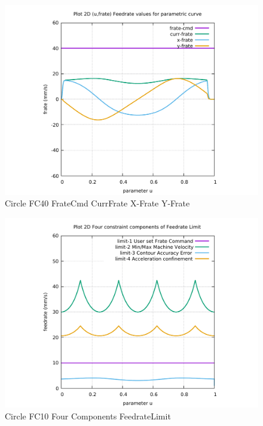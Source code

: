 \begin{figure}
	\caption     {Circle FC40 FrateCmd CurrFrate X-Frate Y-Frate}
	\label{30-img-Circle-FC40-FrateCmd-CurrFrate-X-Frate-Y-Frate.pdf}
	\includegraphics[width=1.00\textwidth]{Chap4/appendix/app-Circle/plots/30-img-Circle-FC40-FrateCmd-CurrFrate-X-Frate-Y-Frate.pdf}
\end{figure}


\clearpage
\pagebreak

\begin{figure}
	\caption     {Circle FC10 Four Components FeedrateLimit}
	\label{31-img-Circle-FC10-Four-Components-FeedrateLimit.pdf}
\includegraphics[width=1.00\textwidth]{Chap4/appendix/app-Circle/plots/31-img-Circle-FC10-Four-Components-FeedrateLimit.pdf}
\end{figure}



